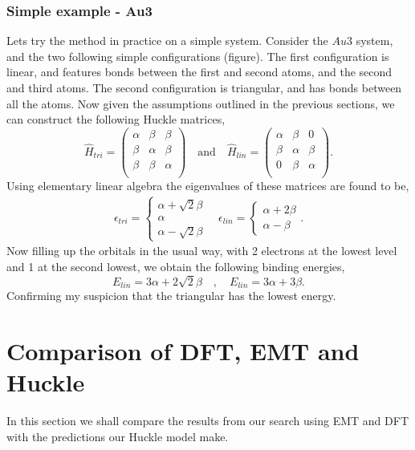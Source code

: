 \subsection{Simple example - Au3}
Lets try the method in practice on a simple system. Consider the $Au3$ system, and the two following simple configurations (figure). The first configuration is linear, and features bonds between the first and second atoms, and the second and third atoms. The second configuration is triangular, and has bonds between all the atoms. Now given the assumptions outlined in the previous sections, we can construct the following Huckle matrices,
\[
\hat{H}_{tri} = 
\begin{pmatrix}
    \alpha & \beta & \beta \\
    \beta & \alpha & \beta \\
    \beta & \beta & \alpha \\
\end{pmatrix}
\quad 
\text{and}
\quad
\hat{H}_{lin} = 
\begin{pmatrix}
    \alpha & \beta & 0 \\
    \beta & \alpha & \beta\\
    0 & \beta & \alpha \\
\end{pmatrix}
.\] 
Using elementary linear algebra the eigenvalues of these matrices are found to be,
\begin{align*}
    \epsilon_{tri} = \begin{cases}
        \alpha + \sqrt{2} \beta \\
        \alpha \\
        \alpha - \sqrt{2} \beta
    \end{cases}
    \quad
    \epsilon_{lin} = \begin{cases}
        \alpha + 2\beta \\
        \alpha - \beta 
    \end{cases}
.\end{align*}
\color{foreground} 
Now filling up the orbitals in the usual way, with 2 electrons at the lowest level and 1 at the second lowest, we obtain the following binding energies,
\[
E_{lin} = 3\alpha + 2\sqrt{2} \beta \quad , \quad E_{lin} = 3\alpha + 3\beta
.\] 
Confirming my suspicion that the triangular has the lowest energy.
\chapter{Comparison of DFT, EMT and Huckle}
In this section we shall compare the results from our search using EMT and DFT with the predictions our Huckle model make.
